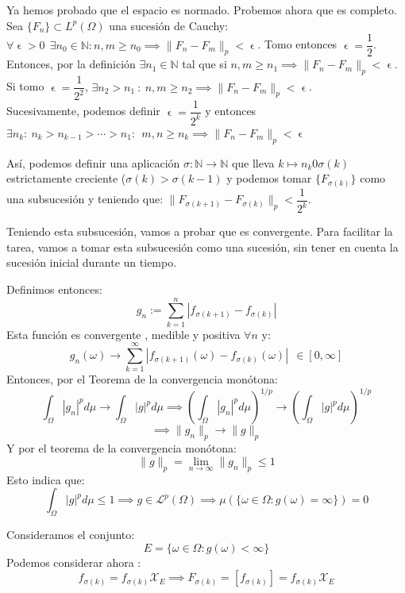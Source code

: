 \documentclass[11pt, a4paper]{article}
\makeatletter
\newif\IfInSansMode
\let\oldsf\sffamily
\renewcommand*{\sffamily}{\oldsf\mathversion{sans}\InSansModetrue}
\let\oldnorm\normalfont
\renewcommand*{\normalfont}{\oldnorm\InSansModefalse\mathversion{normal}}
\let\epsilon\upvarepsilon
\renewenvironment{proof}[1][\proofname] {\par\pushQED{\qed}\normalfont\topsep6\p@\@plus6\p@\relax\trivlist\item[\hskip\labelsep\itshape\sffamily#1\@addpunct{.}]\ignorespaces}{\popQED\endtrivlist\@endpefalse}
\theoremstyle{theorem-style}
\theoremstyle{definition-style}
\theoremstyle{remark-style}
\theoremstyle{example-style}
\makeatother
\begin{document}
\begin{proof}
  Ya hemos probado que el espacio es normado. Probemos ahora que es completo.\\
  
  Sea $\{ F_n\} \subset L^p(\Omega)$ una sucesión de Cauchy: $\forall \epsilon > 0 \ \ \exists n_0 \in \mathbb N : n,m \geq n_0 \implies \| F_n - F_m \|_p < \epsilon$.
  Tomo entonces $\epsilon = \dfrac{1}{2}$. Entonces, por la definición $\exists n_1 \in \mathbb N$ tal que si $n,m \geq n_1 \implies \| F_n - F_m \|_p < \epsilon $.
  Si tomo $\epsilon = \dfrac{1}{2^2}$, $\exists n_2 > n_1 \ : \ n,m \geq n_2 \implies \| F_n - F_m \|_p < \epsilon$.\\
  Sucesivamente, podemos definir $\epsilon= \dfrac{1}{2^k}$ y entonces $\exists n_k : \ n_k > n_{k-1} > \cdots > n_1 : \ \ m,n \geq n_k \implies \| F_n - F_m \|_p < \epsilon$
  
  Así, podemos definir una aplicación $\sigma: \mathbb N \to \mathbb N$ que lleva $k \mapsto n_k 0 \sigma(k)$ estrictamente creciente ($\sigma(k) > \sigma(k-1)$ y podemos tomar $\{F_{\sigma(k)}\}$ como una subsucesión y teniendo que: $\| F_{\sigma(k+1)} - F_{\sigma(k)} \|_p < \dfrac{1}{2^k}$.
  
  Teniendo esta subsucesión, vamos a probar que es convergente. Para facilitar la tarea, vamos a tomar esta subsucesión como una sucesión, sin tener en cuenta la sucesión inicial durante un tiempo.
  
  Definimos entonces:
  \[
    g_n := \sum_{k=1}^n |f_{\sigma(k+1)} - f_{\sigma(k)}|
  \]
  Esta función es convergente , medible y positiva $\forall n$ y:
  \[
    g_n(\omega) \to \sum_{k=1}^\infty |f_{\sigma(k+1)}(\omega) - f_{\sigma(k)}(\omega)| \ \ \in [0,\infty]
  \]
  Entonces, por el Teorema de la convergencia monótona:
  \[
    \int_\Omega |g_n|^p d\mu \to \int_\Omega |g|^p d\mu \implies (\int_\Omega |g_n|^p d\mu)^{1/p} \to (\int_\Omega |g|^p d\mu)^{1/p} 
  \]
  \[
    \implies \|g_n\|_p \to \|g\|_p
  \]
  Y por el teorema de la convergencia monótona:
  \[
    \|g\|_p = \lim_{n\to \infty} \|g_n\|_p \leq 1  
  \]
  Esto indica que:
  \[
    \int_\Omega |g|^p d\mu \leq 1 \implies g \in \mathcal L ^p(\Omega) \implies \mu(\{ \omega \in \Omega : g(\omega) = \infty\}) = 0
  \]
  
  Consideramos el conjunto:
  \[
    E = \{ \omega \in \Omega : g(\omega) < \infty\}
  \]	
  Podemos considerar ahora :
  \[
    f_{\sigma(k)} = f_{\sigma(k)} \mathcal X _E \implies F_{\sigma(k)} = [f_{\sigma(k)}] = f_{\sigma(k)} \mathcal X _E
  \]
  

\end{proof}
\end{document}
